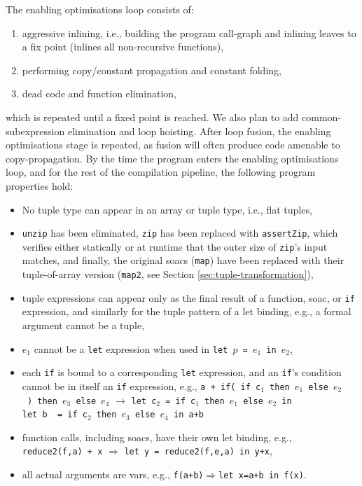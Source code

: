 \documentclass{sigplanconf}  %
\begin{document}
The enabling optimisations loop consists of:
\begin{enumerate}
\item aggressive inlining, i.e., building the program call-graph
  and inlining leaves to a fix point (inlines all non-recursive functions),
\item performing copy/constant propagation and constant folding,
\item dead code and function elimination,
\end{enumerate}
which is repeated until a fixed point is reached.  We also plan to add
common-subexpression elimination and loop hoisting.  After loop
fusion, the enabling optimisations stage is repeated, as fusion will
often produce code amenable to copy-propagation.  By the time the
program enters the enabling optimisations loop, and for the rest of
the compilation pipeline, the following program properties hold:

\begin{itemize}
\item No tuple type can appear in an array or tuple type, i.e., flat tuples,
\item {\tt unzip} has been eliminated, {\tt zip} has been
  replaced with {\tt assertZip}, which verifies either
  statically or at runtime that the outer size of {\tt zip}'s
  input matches, and finally, the original {\sc soac}s ({\tt map})
  have been replaced with their tuple-of-array version ({\tt map2}, see Section \ref{sec:tuple-transformation}),
\item tuple expressions can appear only as the final result of
  a function, {\sc soac}, or {\tt if} expression, and similarly
  for the tuple pattern of a let binding, e.g., a formal argument
  cannot be a tuple,
\item %
  $e_1$ cannot be a {\tt let} expression when used 
  in {\tt let~$p$~=~$e_1$~in~$e_2$},
\item each {\tt if} is bound to a corresponding {\tt let} expression, and an
  {\tt if}'s condition cannot be in itself an {\tt if} expression, e.g.,
  {\tt a~+~if(~if~c$_1$~then~$e_1$~else~$e_2$~)~then~$e_3$~else~$e_4$} $\rightarrow$
  {\tt let~c$_2$~=~if~c$_1$~then~$e_1$~else~$e_2$~in}\\
  {\tt let~b~~=~if~c$_2$~then~$e_3$~else~$e_4$~in~a+b}
\item function calls, including {\sc soac}s, have their own let binding,
  e.g., {\tt reduce2(f,a)~+~x} $\Rightarrow$
  {\tt let~y~=~reduce2(f,e,a)~in~y+x},
\item all actual arguments are vars,
  e.g., {\tt f(a+b)}$\Rightarrow${\tt let~x=a+b~in~f(x)}.
\end{itemize}
\end{document}
